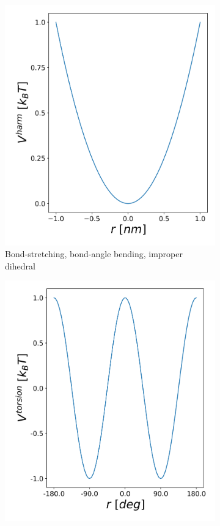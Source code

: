 \begin{figure}[h!]
    \centering
    \begin{subfigure}{0.45\textwidth}
        \includegraphics[width=\textwidth]{2_chapter_intro/fig/ForceField/harmOscV.png}
        \caption{Bond-stretching, bond-angle bending, improper dihedral}
	\label{sfig:ho}
    \end{subfigure}
        \begin{subfigure}{0.45\textwidth}
        \includegraphics[width=\textwidth]{2_chapter_intro/fig/ForceField/torsV.png}

\end{subfigure}
\end{figure}
